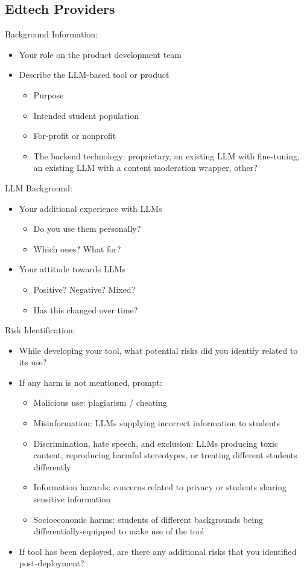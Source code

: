 \subsection{Edtech Providers}
Background Information: 
\begin{itemize}
    \item Your role on the product development team
    \item Describe the LLM-based tool or product
    \begin{itemize}
        \item Purpose
        \item Intended student population
        \item For-profit or nonprofit 
        \item The backend technology: proprietary, an existing LLM with fine-tuning, an existing LLM with a content moderation wrapper, other? 
    \end{itemize}
\end{itemize}
LLM Background: 
\begin{itemize}
    \item Your additional experience with LLMs
    \begin{itemize}
        \item Do you use them personally?
        \item Which ones? What for? 
    \end{itemize} 
    \item Your attitude towards LLMs 
    \begin{itemize}
        \item Positive? Negative? Mixed?
        \item Has this changed over time?
    \end{itemize}  
\end{itemize}
Risk Identification:
\begin{itemize}
    \item While developing your tool, what potential risks did you identify related to its use? 
    \item If any harm is not mentioned, prompt: 
    \begin{itemize}
        \item Malicious use: plagiarism / cheating
        \item Misinformation: LLMs supplying incorrect information to students
        \item Discrimination, hate speech, and exclusion: LLMs producing toxic content, reproducing harmful stereotypes, or treating different students differently
        \item Information hazards: concerns related to privacy or students sharing sensitive information
        \item Socioeconomic harms: students of different backgrounds being differentially-equipped to make use of the tool    \end{itemize}
    \item If tool has been deployed, are there any additional risks that you identified post-deployment? 
\end{itemize}

